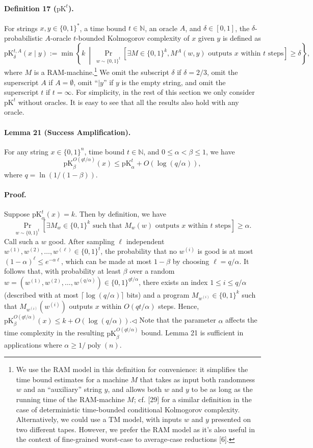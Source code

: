 \documentclass[10pt,a4paper]{article}
\begin{document}
\paragraph{Definition 17 ($\mathrm{pK}^t$).} For strings $x,y\in\{0,1\}^*$, a time bound $t\in\mathbb N$, an oracle $A$, and $\delta\in[0,1]$, the $\delta$-probabilistic $A$-oracle $t$-bounded Kolmogorov complexity of $x$ given $y$ is defined as
\[\mathrm{pK}_\delta^{t,A}(x\mid y):=\min\left\{k\ \middle|\ \Pr_{w\sim\{0,1\}^t}[\exists M\in\{0,1\}^k,M^A(w,y)\text{ outputs }x\text{ within }t\text{ steps}]\geq\delta\right\},\]
where $M$ is a RAM-machine.\footnote{We use the RAM model in this definition for convenience: it simplifies the time bound estimates for a machine $M$ that takes as input both randomness $w$ and an ``auxiliary'' string $y$, and allows both $w$ and $y$ to be as long as the running time of the RAM-machine $M$; cf. [29] for a similar definition in the case of deterministic time-bounded conditional Kolmogorov complexity. Alternatively, we could use a TM model, with inputs $w$ and $y$ presented on two different tapes. However, we prefer the RAM model as it's also useful in the context of fine-grained worst-case to average-case reductions [6].} We omit the subscript $\delta$ if $\delta=2/3$, omit the superscript $A$ if $A=\emptyset$, omit ``$\mid y$'' if $y$ is the empty string, and omit the superscript $t$ if $t=\infty$.
For simplicity, in the rest of this section we only consider $\mathrm{pK}^t$ without oracles. It is easy to see that all the results also hold with any oracle.
\paragraph{Lemma 21 (Success Amplification).} For any string $x\in\{0,1\}^n$, time bound $t\in\mathbb N$, and $0\leq\alpha<\beta\leq1$, we have
\[\mathrm{pK}_\beta^{O(qt/\alpha)}(x)\leq\mathrm{pK}_\alpha^t+O(\log(q/\alpha)),\]
where $q=\ln(1/(1-\beta))$.
\paragraph{Proof.} Suppose $\mathrm{pK}_\alpha^t(x)=k$. Then by definition, we have
\[\Pr_{w\sim\{0,1\}^t}[\exists M_w\in\{0,1\}^k\text{ such that }M_w(w)\text{ outputs }x\text{ within }t\text{ steps}]\geq\alpha.\]
Call such a $w$ good. After sampling $\ell$ independent $w^{(1)},w^{(2)},\ldots,w^{(\ell)}\in\{0,1\}^t$, the probability that no $w^{(i)}$ is good is at most $(1-\alpha)^\ell\leq e^{-\alpha\ell}$, which can be made at most $1-\beta$ by choosing $\ell=q/\alpha$. It follows that, with probability at least $\beta$ over a random $w=(w^{(1)},w^{(2)},\ldots,w^{(q/\alpha)})\in\{0,1\}^{qt/\alpha}$, there exists an index $1\leq i\leq q/\alpha$ (described with at most $\lceil\log(q/\alpha)\rceil$ bits) and a program $M_{w^{(i)}}\in\{0,1\}^k$ such that $M_{w^{(i)}}(w^{(i)})$ outputs $x$ within $O(qt/\alpha)$ steps. Hence, $\mathrm{pK}_\beta^{O(qt/\alpha)}(x)\leq k+O(\log(q/\alpha))$.\hfill$\triangleleft$
Note that the parameter $\alpha$ affects the time complexity in the resulting $\mathrm{pK}_\beta^{O(qt/\alpha)}$ bound. Lemma 21 is sufficient in applications where $\alpha\geq1/\operatorname{poly}(n)$.
\end{document}
